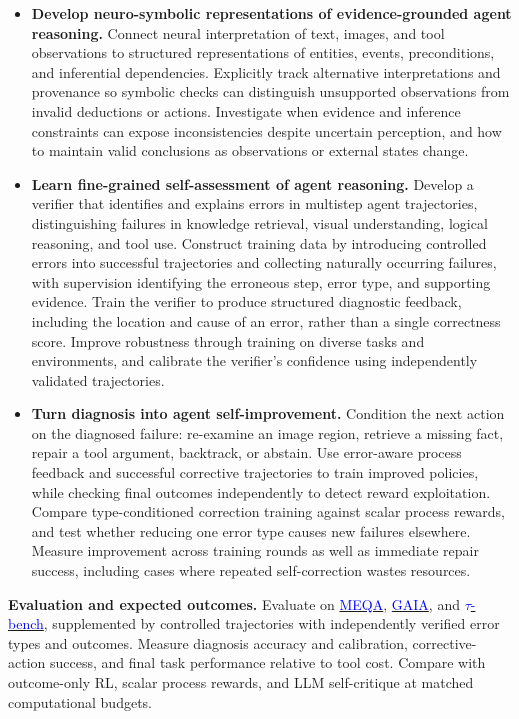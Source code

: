 \documentclass[11pt,letterpaper]{article}
\newcommand{\head}[1]{\textbf{#1}\enspace}
\begin{document}
\begin{itemize}
\item \textbf{Develop neuro-symbolic representations of evidence-grounded agent reasoning.} Connect neural interpretation of text, images, and tool observations to structured representations of entities, events, preconditions, and inferential dependencies. Explicitly track alternative interpretations and provenance so symbolic checks can distinguish unsupported observations from invalid deductions or actions. Investigate when evidence and inference constraints can expose inconsistencies despite uncertain perception, and how to maintain valid conclusions as observations or external states change.
\item \textbf{Learn fine-grained self-assessment of agent reasoning.} Develop a verifier that identifies and explains errors in multistep agent trajectories, distinguishing failures in knowledge retrieval, visual understanding, logical reasoning, and tool use. Construct training data by introducing controlled errors into successful trajectories and collecting naturally occurring failures, with supervision identifying the erroneous step, error type, and supporting evidence. Train the verifier to produce structured diagnostic feedback, including the location and cause of an error, rather than a single correctness score. Improve robustness through training on diverse tasks and environments, and calibrate the verifier's confidence using independently validated trajectories.
\item \textbf{Turn diagnosis into agent self-improvement.} Condition the next action on the diagnosed failure: re-examine an image region, retrieve a missing fact, repair a tool argument, backtrack, or abstain. Use error-aware process feedback and successful corrective trajectories to train improved policies, while checking final outcomes independently to detect reward exploitation. Compare type-conditioned correction training against scalar process rewards, and test whether reducing one error type causes new failures elsewhere. Measure improvement across training rounds as well as immediate repair success, including cases where repeated self-correction wastes resources.
\end{itemize}
\head{Evaluation and expected outcomes.} Evaluate on \href{https://proceedings.neurips.cc/paper_files/paper/2024/hash/e560a0b22e4432003d0dba63ff8dc457-Abstract-Datasets_and_Benchmarks_Track.html}{\textcolor{blue}{MEQA}}, \href{https://arxiv.org/abs/2311.12983}{\textcolor{blue}{GAIA}}, and \href{https://arxiv.org/abs/2406.12045}{\textcolor{blue}{$\tau$-bench}}, supplemented by controlled trajectories with independently verified error types and outcomes. Measure diagnosis accuracy and calibration, corrective-action success, and final task performance relative to tool cost. Compare with outcome-only RL, scalar process rewards, and LLM self-critique at matched computational budgets.
\end{document}
